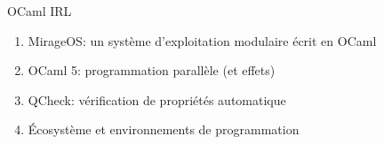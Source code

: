 
\begin{frame}{OCaml IRL}

\begin{enumerate}[label=\small\ding{114}]
    \item MirageOS: un système d'exploitation modulaire écrit en OCaml
    \item OCaml 5: programmation parallèle (et effets)
    \item QCheck: vérification de propriétés automatique
    \item Écosystème et environnements de programmation
\end{enumerate}
    
\end{frame}
